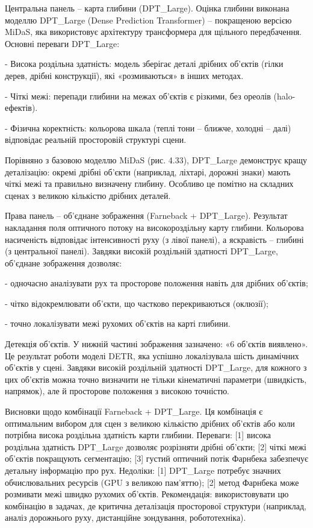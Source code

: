 \documentclass[
]{article}
\begin{document}
Центральна панель -- карта глибини (DPT\_Large). Оцінка глибини виконана моделлю DPT\_Large (Dense Prediction Transformer) -- покращеною версією MiDaS, яка використовує архітектуру трансформера для щільного передбачення. Основні переваги DPT\_Large:

- Висока роздільна здатність: модель зберігає деталі дрібних об'єктів (гілки дерев, дрібні конструкції), які «розмиваються» в інших методах.

- Чіткі межі: перепади глибини на межах об'єктів є різкими, без ореолів (halo-ефектів).

- Фізична коректність: кольорова шкала (теплі тони -- ближче, холодні -- далі) відповідає реальній просторовій структурі сцени.

Порівняно з базовою моделлю MiDaS (рис. 4.33), DPT\_Large демонструє кращу деталізацію: окремі дрібні об'єкти (наприклад, ліхтарі, дорожні знаки) мають чіткі межі та правильно визначену глибину. Особливо це помітно на складних сценах з великою кількістю дрібних деталей.

Права панель -- об'єднане зображення (Farneback + DPT\_Large). Результат накладання поля оптичного потоку на високороздільну карту глибини. Кольорова насиченість відповідає інтенсивності руху (з лівої панелі), а яскравість -- глибині (з центральної панелі). Завдяки високій роздільній здатності DPT\_Large, об'єднане зображення дозволяє:

- одночасно аналізувати рух та просторове положення навіть для дрібних об'єктів;

- чітко відокремлювати об'єкти, що частково перекриваються (оклюзії);

- точно локалізувати межі рухомих об'єктів на карті глибини.

Детекція об'єктів. У нижній частині зображення зазначено: «6 об'єктів виявлено». Це результат роботи моделі DETR, яка успішно локалізувала шість динамічних об'єктів у сцені. Завдяки високій роздільній здатності DPT\_Large, для кожного з цих об'єктів можна точно визначити не тільки кінематичні параметри (швидкість, напрямок), але й просторове положення з високою точністю.

Висновки щодо комбінації Farneback + DPT\_Large. Ця комбінація є оптимальним вибором для сцен з великою кількістю дрібних об'єктів або коли потрібна висока роздільна здатність карти глибини. Переваги: {[}1{]} висока роздільна здатність DPT\_Large дозволяє розрізняти дрібні об'єкти; {[}2{]} чіткі межі об'єктів покращують сегментацію; {[}3{]} густий оптичний потік Фарнбека забезпечує детальну інформацію про рух. Недоліки: {[}1{]} DPT\_Large потребує значних обчислювальних ресурсів (GPU з великою пам'яттю); {[}2{]} метод Фарнбека може розмивати межі швидко рухомих об'єктів. Рекомендація: використовувати цю комбінацію в задачах, де критична деталізація просторової структури (наприклад, аналіз дорожнього руху, дистанційне зондування, робототехніка).
\end{document}
